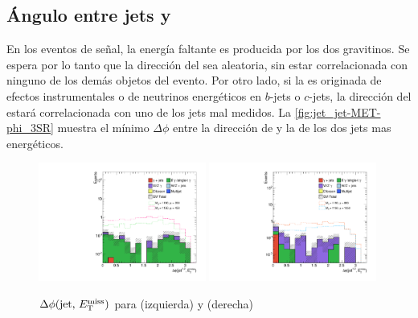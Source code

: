\subsection{Ángulo entre jets y \met}
\label{sec:dphi_obj}

En los eventos de señal, la energía faltante es producida por los dos
gravitinos. Se espera por lo tanto que la dirección del {\met} sea aleatoria,
sin estar correlacionada con ninguno de los demás objetos del evento. Por otro
lado, si la {\met} es originada de efectos instrumentales o de neutrinos
energéticos en $b$-jets o $c$-jets, la dirección del {\met} estará
correlacionada con uno de los jets mal medidos. La
\cref{fig:jet_jet-MET-phi_3SR} muestra el mínimo $\Delta\phi$ entre la dirección
de {\met} y la de los dos jets mas energéticos.



\begin{figure}[!htbp]
  \centering
  \includegraphics[width=0.49\textwidth]{figures/dphi_jetmet_srl}
  \includegraphics[width=0.49\textwidth]{figures/dphi_jetmet_srh}
  \caption{$\Delta \phi \text{(jet, \ensuremath{E_{\mathrm{T}}^{\mathrm{miss}}})}$ para {\SRL} (izquierda) y {\SRH} (derecha)}
  \label{fig:jet-MET-phi_3SR}
\end{figure}


